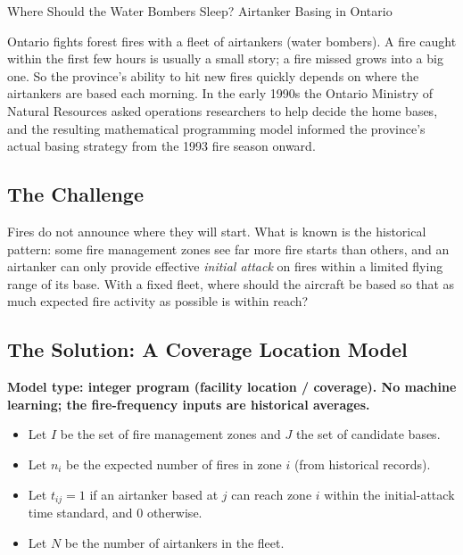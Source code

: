 \begin{casestudybox}{Where Should the Water Bombers Sleep? Airtanker Basing in Ontario}

Ontario fights forest fires with a fleet of airtankers (water bombers).  A fire caught within the first few hours is usually a small story; a fire missed grows into a big one.  So the province's ability to hit new fires quickly depends on where the airtankers are based each morning.  In the early 1990s the Ontario Ministry of Natural Resources asked operations researchers to help decide the home bases, and the resulting mathematical programming model informed the province's actual basing strategy from the 1993 fire season onward.

\subsection*{The Challenge}
Fires do not announce where they will start.  What is known is the historical pattern: some fire management zones see far more fire starts than others, and an airtanker can only provide effective \emph{initial attack} on fires within a limited flying range of its base.  With a fixed fleet, where should the aircraft be based so that as much expected fire activity as possible is within reach?

\subsection*{The Solution: A Coverage Location Model}
\textbf{Model type: integer program (facility location / coverage).  No machine learning; the fire-frequency inputs are historical averages.}

\begin{itemize}
\item Let $I$ be the set of fire management zones and $J$ the set of candidate bases.
\item Let $n_i$ be the expected number of fires in zone $i$ (from historical records).
\item Let $t_{ij} = 1$ if an airtanker based at $j$ can reach zone $i$ within the initial-attack time standard, and $0$ otherwise.
\item Let $N$ be the number of airtankers in the fleet.
\end{itemize}


\end{casestudybox}
